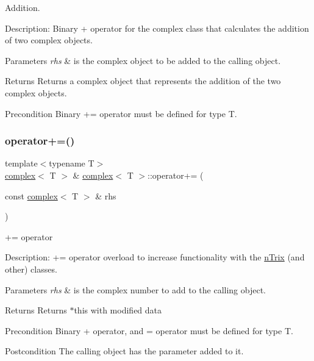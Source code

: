 Addition. 

Description\+: Binary + operator for the complex class that calculates the addition of two complex objects. 
\begin{DoxyParams}{Parameters}
{\em rhs} & is the complex object to be added to the calling object. \\
\hline
\end{DoxyParams}
\begin{DoxyReturn}{Returns}
Returns a complex object that represents the addition of the two complex objects. 
\end{DoxyReturn}
\begin{DoxyPrecond}{Precondition}
Binary += operator must be defined for type T. 
\end{DoxyPrecond}
\mbox{\label{classcomplex_addf9684dc875ae196619c9fadd5fe48e}} 
\subsubsection{\texorpdfstring{operator+=()}{operator+=()}}
{\footnotesize\ttfamily template$<$typename T$>$ \\
\hyperlink{classcomplex}{complex}$<$ T $>$ \& \hyperlink{classcomplex}{complex}$<$ T $>$\+::operator+= (\begin{DoxyParamCaption}\item[{const \hyperlink{classcomplex}{complex}$<$ T $>$ \&}]{rhs }\end{DoxyParamCaption})}



+= operator 

Description\+: += operator overload to increase functionality with the \hyperlink{classnTrix}{n\+Trix} (and other) classes. 
\begin{DoxyParams}{Parameters}
{\em rhs} & is the complex number to add to the calling object. \\
\hline
\end{DoxyParams}
\begin{DoxyReturn}{Returns}
Returns $\ast$this with modified data 
\end{DoxyReturn}
\begin{DoxyPrecond}{Precondition}
Binary + operator, and = operator must be defined for type T. 
\end{DoxyPrecond}
\begin{DoxyPostcond}{Postcondition}
The calling object has the parameter added to it. 
\end{DoxyPostcond}
\mbox{\label{classcomplex_abef23308534cc50484e7d154a8497dbc}} 
